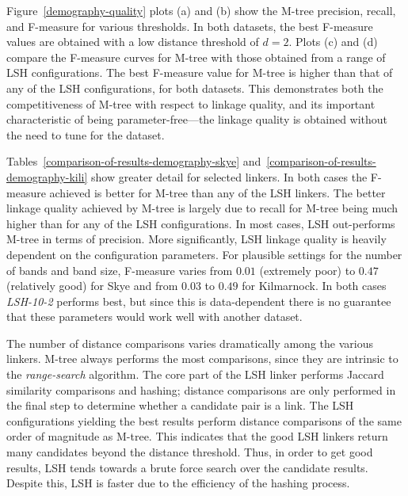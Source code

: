 \documentclass{llncs}
\begin{document}
Figure~\ref{demography-quality} plots (a) and (b) show the M-tree precision,
recall, and F-measure for various thresholds. In both datasets, the best
F-measure values are obtained with a low distance threshold of $d=2$.
Plots (c) and (d) compare the F-measure curves for M-tree with those
obtained from a range of LSH configurations. The best F-measure value
for M-tree is higher than that of any of the LSH configurations, for
both datasets. This demonstrates both the competitiveness of M-tree
with respect to linkage quality, and its important characteristic of
being parameter-free---the linkage quality is obtained without the
need to tune for the dataset.

Tables~\ref{comparison-of-results-demography-skye}
and~\ref{comparison-of-results-demography-kili} show greater detail for
selected linkers. In both cases the F-measure achieved is better for
M-tree than any of the LSH linkers. The better linkage quality achieved
by M-tree is largely due to recall for M-tree being much higher than for
any of the LSH configurations. In most cases, LSH out-performs M-tree in
terms of precision. More significantly, LSH linkage quality is heavily
dependent on the configuration parameters. For plausible settings for
the number of bands and band size, F-measure varies from $0.01$
(extremely poor) to $0.47$ (relatively good) for Skye and from $0.03$
to $0.49$ for Kilmarnock. In both cases \emph{LSH-10-2} performs best,
but since this is data-dependent there is no guarantee that these
parameters would work well with another dataset.

The number of distance comparisons varies dramatically among the various
linkers. M-tree always performs the most comparisons, since they are
intrinsic to the \emph{range-search} algorithm. The core part of the LSH
linker performs Jaccard similarity comparisons and hashing; distance
comparisons are only performed in the final step to determine whether a
candidate pair is a link. The LSH configurations yielding the best
results perform distance comparisons of the same order of magnitude as
M-tree. This indicates that the good LSH linkers return many candidates
beyond the distance threshold. Thus, in order to get good results, LSH
tends towards a brute force search over the candidate results. Despite
this, LSH is faster due to the efficiency of the hashing process.

\end{document}
